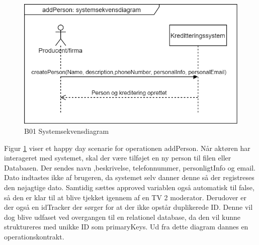 \begin{figure}[H]
    \centering
    \includegraphics[scale = 0.4]{images/B01SSD.png}
    \caption{B01 Systemsekvensdiagram}
    \label{fig:B01_Systemsekvensdiagram}
\end{figure}

Figur \ref{fig:B01_Systemsekvensdiagram} viser et happy day scenarie for operationen addPerson. Når aktøren har interageret med systemet, skal der være tilføjet en ny person til filen eller Databasen. Der sendes navn ,beskrivelse, telefonnummer, personligtInfo og email. Dato indtastes ikke af brugeren, da systemet selv danner denne så der registreses den nøjagtige dato. Samtidig sættes approved variablen også automatisk til false, så den er klar til at blive tjekket igennem af en TV 2 moderator. Derudover er der også en idTracker der sørger for at der ikke opstår duplikerede ID. Denne vil dog blive udfaset ved overgangen til en relationel database, da den vil kunne struktureres med unikke ID som primaryKeys.  Ud fra dette diagram dannes en operationskontrakt.



